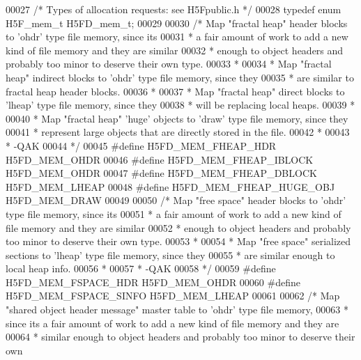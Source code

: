 \begin{DoxyCode}
00027 \textcolor{comment}{/* Types of allocation requests: see H5Fpublic.h  */}
00028 \textcolor{keyword}{typedef} \textcolor{keyword}{enum} H5F\_mem\_t  H5FD\_mem\_t;
00029 
00030 \textcolor{comment}{/* Map "fractal heap" header blocks to 'ohdr' type file memory, since its}
00031 \textcolor{comment}{ * a fair amount of work to add a new kind of file memory and they are similar}
00032 \textcolor{comment}{ * enough to object headers and probably too minor to deserve their own type.}
00033 \textcolor{comment}{ *}
00034 \textcolor{comment}{ * Map "fractal heap" indirect blocks to 'ohdr' type file memory, since they}
00035 \textcolor{comment}{ * are similar to fractal heap header blocks.}
00036 \textcolor{comment}{ *}
00037 \textcolor{comment}{ * Map "fractal heap" direct blocks to 'lheap' type file memory, since they}
00038 \textcolor{comment}{ * will be replacing local heaps.}
00039 \textcolor{comment}{ *}
00040 \textcolor{comment}{ * Map "fractal heap" 'huge' objects to 'draw' type file memory, since they}
00041 \textcolor{comment}{ * represent large objects that are directly stored in the file.}
00042 \textcolor{comment}{ *}
00043 \textcolor{comment}{ *      -QAK}
00044 \textcolor{comment}{ */}
00045 \textcolor{preprocessor}{#define H5FD\_MEM\_FHEAP\_HDR      H5FD\_MEM\_OHDR}
00046 \textcolor{preprocessor}{#define H5FD\_MEM\_FHEAP\_IBLOCK   H5FD\_MEM\_OHDR}
00047 \textcolor{preprocessor}{#define H5FD\_MEM\_FHEAP\_DBLOCK   H5FD\_MEM\_LHEAP}
00048 \textcolor{preprocessor}{#define H5FD\_MEM\_FHEAP\_HUGE\_OBJ H5FD\_MEM\_DRAW}
00049 
00050 \textcolor{comment}{/* Map "free space" header blocks to 'ohdr' type file memory, since its}
00051 \textcolor{comment}{ * a fair amount of work to add a new kind of file memory and they are similar}
00052 \textcolor{comment}{ * enough to object headers and probably too minor to deserve their own type.}
00053 \textcolor{comment}{ *}
00054 \textcolor{comment}{ * Map "free space" serialized sections to 'lheap' type file memory, since they}
00055 \textcolor{comment}{ * are similar enough to local heap info.}
00056 \textcolor{comment}{ *}
00057 \textcolor{comment}{ *      -QAK}
00058 \textcolor{comment}{ */}
00059 \textcolor{preprocessor}{#define H5FD\_MEM\_FSPACE\_HDR     H5FD\_MEM\_OHDR}
00060 \textcolor{preprocessor}{#define H5FD\_MEM\_FSPACE\_SINFO   H5FD\_MEM\_LHEAP}
00061 
00062 \textcolor{comment}{/* Map "shared object header message" master table to 'ohdr' type file memory,}
00063 \textcolor{comment}{ * since its a fair amount of work to add a new kind of file memory and they are}
00064 \textcolor{comment}{ * similar enough to object headers and probably too minor to deserve their own}

\end{DoxyCode}

